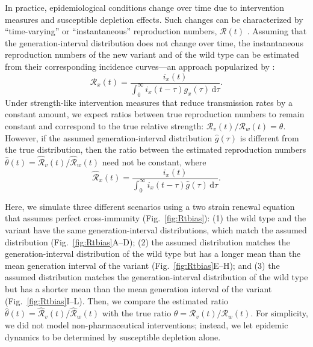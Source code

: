 \documentclass[12pt]{article}
\newcommand{\fref}[1]{Fig.~\ref{fig:#1}}
\newcommand{\RR}{\ensuremath{{\mathcal R}}\xspace}
\newcommand{\dd}[1]{\ensuremath{\, \mathrm{d}#1}}
\newcommand{\dtau}{\dd{\tau}}
\begin{document}
In practice, epidemiological conditions change over time due to intervention measures and susceptible depletion effects.
Such changes can be characterized by ``time-varying'' or ``instantaneous'' reproduction numbers, $\RR(t)$ \citep{fraser2007estimating}.
Assuming that the generation-interval distribution does not change over time, the instantaneous reproduction numbers of the new variant and of the wild type can be estimated from their corresponding incidence curves---an approach popularized by \cite{cori2013new}:
\begin{equation}
\RR_x(t) = \frac{i_x(t)}{\int_0^\infty i_x(t-\tau) g_x(\tau) \dtau}.
\end{equation}
Under strength-like intervention measures that reduce transmission rates by a constant amount, we expect ratios between true reproduction numbers to remain constant and correspond to the true relative strength: $\RR_v(t)/\RR_w(t) = \theta$.
However, if the assumed generation-interval distribution $\hat{g}(\tau)$ is different from the true distribution, then the ratio between the estimated reproduction numbers $\hat{\theta}(t) = \hat{\RR}_v(t)/\hat{\RR}_w(t)$ need not be constant, where
\begin{equation}
\hat{\RR}_x(t) = \frac{i_x(t)}{\int_0^\infty i_x(t-\tau) \hat{g}(\tau) \dtau}.
\end{equation}

Here, we simulate three different scenarios using a two strain renewal equation that assumes perfect cross-immunity (\fref{Rtbias}): 
(1) the wild type and the variant have the same generation-interval distributions, which match the assumed distribution (\fref{Rtbias}A--D);
(2) the assumed distribution matches the generation-interval distribution of the wild type but has a longer mean than the mean generation interval of the variant (\fref{Rtbias}E--H); and
(3) the assumed distribution matches the generation-interval distribution of the wild type but has a shorter mean than the mean generation interval of the variant (\fref{Rtbias}I--L).
Then, we compare the estimated ratio $\hat{\theta}(t) = \hat{\RR}_v(t)/\hat{\RR}_w(t)$ with the true ratio $\theta = \RR_v(t)/\RR_w(t)$.
For simplicity, we did not model non-pharmaceutical interventions;
instead, we let epidemic dynamics to be determined by susceptible depletion alone.
\end{document}
